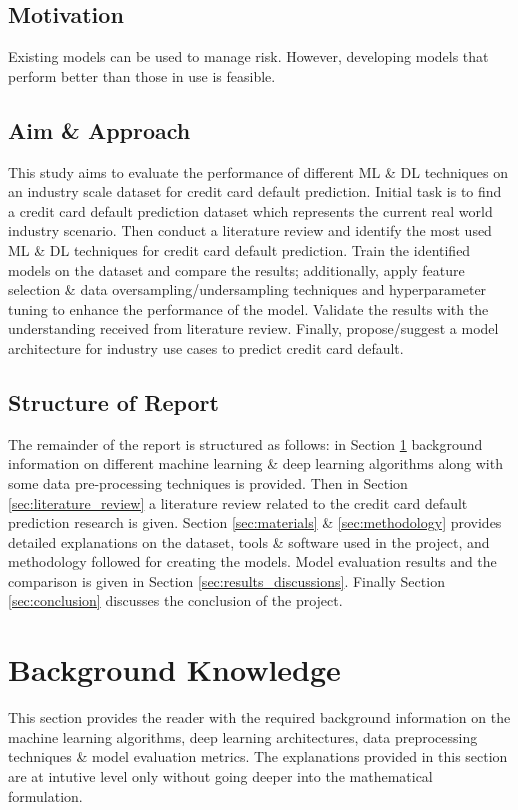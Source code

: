 \documentclass[twoside,11pt,a4paper]{article}
\begin{document}
\subsection{Motivation}

Existing models can be used to manage risk. However, developing models that perform better than those in use is feasible.

\subsection{Aim \& Approach}

This study aims to evaluate the performance of different \acf{ML} \&  \acf{DL} techniques on an industry scale dataset for credit card default prediction. Initial task is to find a credit card default prediction dataset which represents the current real world industry scenario. Then conduct a literature review and identify the most used \acs{ML} \& \acs{DL} techniques for credit card default prediction. Train the identified models on the dataset and compare the results; additionally, apply feature selection \& data oversampling/undersampling techniques and hyperparameter tuning to enhance the performance of the model. Validate the results with the understanding received from literature review. Finally, propose/suggest a model architecture for industry use cases to predict credit card default.

\subsection{Structure of Report}
The remainder of the report is structured as follows: in Section \ref{sec:background_knowledge} background information on different machine learning \& deep learning algorithms along with some data pre-processing techniques is provided. Then in Section \ref{sec:literature_review} a literature review related to the credit card default prediction research is given. Section \ref{sec:materials} \& \ref{sec:methodology} provides detailed explanations on the dataset, tools \& software used in the project, and methodology followed for creating the models. Model evaluation results and the comparison is given in Section \ref{sec:results_discussions}. Finally Section \ref{sec:conclusion} discusses the conclusion of the project. 
\vfill
\clearpage
\section{Background Knowledge} \label{sec:background_knowledge}
This section provides the reader with the required background information on the machine learning algorithms, deep learning architectures, data preprocessing techniques \& model evaluation metrics. The explanations provided in this section are at intutive level only without going deeper into the mathematical formulation.
\end{document}

